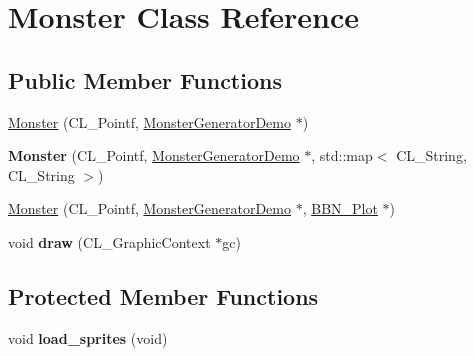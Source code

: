 \hypertarget{classMonster}{
\section{Monster Class Reference}
\label{classMonster}
}
\subsection*{Public Member Functions}
\begin{DoxyCompactItemize}
\item 
\hyperlink{classMonster_af4dbf8422477e5d7a8c8639ed8a6e7a7}{Monster} (CL\_\-Pointf, \hyperlink{classMonsterGeneratorDemo}{MonsterGeneratorDemo} $\ast$)
\item 
\hypertarget{classMonster_a8a20f88b9eef236ffc3f1d7ce6bd1562}{
{\bfseries Monster} (CL\_\-Pointf, \hyperlink{classMonsterGeneratorDemo}{MonsterGeneratorDemo} $\ast$, std::map$<$ CL\_\-String, CL\_\-String $>$)}
\label{classMonster_a8a20f88b9eef236ffc3f1d7ce6bd1562}

\item 
\hyperlink{classMonster_a1b3329ad00743bd5432d81ee487ca7ae}{Monster} (CL\_\-Pointf, \hyperlink{classMonsterGeneratorDemo}{MonsterGeneratorDemo} $\ast$, \hyperlink{classBBN__Plot}{BBN\_\-Plot} $\ast$)
\item 
\hypertarget{classMonster_aaf16974cdf557c0e62e445c94ddcfc53}{
void {\bfseries draw} (CL\_\-GraphicContext $\ast$gc)}
\label{classMonster_aaf16974cdf557c0e62e445c94ddcfc53}

\end{DoxyCompactItemize}
\subsection*{Protected Member Functions}
\begin{DoxyCompactItemize}
\item 
\hypertarget{classMonster_a3e1c502f98e13fef189adb45631f4ca2}{
void {\bfseries load\_\-sprites} (void)}
\label{classMonster_a3e1c502f98e13fef189adb45631f4ca2}

\end{DoxyCompactItemize}
